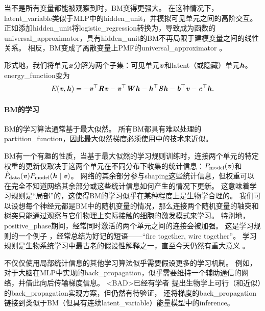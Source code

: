 当不是所有变量都能被观察到时，\gls{BM}变得更强大。
在这种情况下，\gls{latent_variable}类似于\gls{MLP}中的\gls{hidden_unit}，并模拟可见单元之间的高阶交互。
正如添加\gls{hidden_unit}将\gls{logistic_regression}转换为，导致成为函数的\gls{universal_approximator}，具有\gls{hidden_unit}的\gls{BM}不再局限于建模变量之间的线性关系。
相反，\gls{BM}变成了离散变量上\gls{PMF}的\gls{universal_approximator} \citep{LeRoux-Bengio-2008}。


形式地，我们将单元$\boldsymbol{\mathit{x}}$分解为两个子集：可见单元$\boldsymbol{\mathit{v}}$和\gls{latent}（或隐藏）单元$\boldsymbol{\mathit{h}}$。
\gls{energy_function}变为
\begin{align}
 E(\boldsymbol{\mathit{v}}, \boldsymbol{\mathit{h}}) = -\boldsymbol{\mathit{v}}^\top \boldsymbol{\mathit{R}} \boldsymbol{\mathit{v}} - \boldsymbol{\mathit{v}}^\top \boldsymbol{\mathit{W}} \boldsymbol{\mathit{h}} - \boldsymbol{\mathit{h}}^\top \boldsymbol{\mathit{S}} \boldsymbol{\mathit{h}} - \boldsymbol{\mathit{b}}^\top \boldsymbol{\mathit{v}} - \boldsymbol{\mathit{c}}^\top \boldsymbol{\mathit{h}}.
\end{align}
\paragraph{\gls{BM}的学习}\gls{BM}的学习算法通常基于最大似然。
所有\gls{BM}都具有难以处理的\gls{partition_function}，因此最大似然梯度必须使用中的技术来近似。


\gls{BM}有一个有趣的性质，当基于最大似然的学习规则训练时，连接两个单元的特定权重的更新仅取决于这两个单元在不同分布下收集的统计信息：$P_{\text{model}}(\boldsymbol{\mathit{v}})$和$\hat{P}_{\text{data}}(\boldsymbol{\mathit{v}}) P_{\text{model}}(\boldsymbol{\mathit{h}}  \mid  \boldsymbol{\mathit{v}})$。
网络的其余部分参与\gls{shaping}这些统计信息，但权重可以在完全不知道网络其余部分或这些统计信息如何产生的情况下更新。
这意味着学习规则是``局部''的，这使得\gls{BM}的学习似乎在某种程度上是生物学合理的。
我们可以设想每个神经元都是\gls{BM}中的随机变量的情况，那么连接两个随机变量的轴突和树突只能通过观察与它们物理上实际接触的细胞的激发模式来学习。
特别地，\gls{positive_phase}期间，经常同时激活的两个单元之间的连接会被加强。
这是学习规则\citep{Hebb49}的一个例子 ，经常总结为好记的短语——``fire together, wire together''。
学习规则是生物系统学习中最古老的假设性解释之一，直至今天仍然有重大意义 \citep{DelGuidice-et-al-2009}。


不仅仅使用局部统计信息的其他学习算法似乎需要假设更多的学习机制。
例如，对于大脑在\gls{MLP}中实现的\gls{back_propagation}，似乎需要维持一个辅助通信的网络，并借此向后传输梯度信息。
<BAD>已经有学者\citep{Hinton-DL2007,Bengio-arxiv2015} 提出生物学上可行（和近似）的\gls{back_propagation}实现方案，但仍然有待验证，\citet{Bengio-arxiv2015} 还将梯度的\gls{back_propagation}链接到类似于\gls{BM}（但具有连续\gls{latent_variable}）能量模型中的\gls{inference}。

